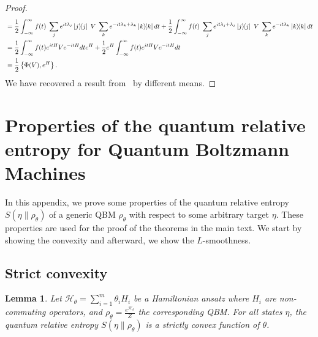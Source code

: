 \documentclass[
    aps,
    prx,
    onecolumn
]{revtex4-2}
\newtheorem{lemma}{Lemma}
\begin{document}
\begin{proof}
\begin{align}
\begin{split}
    &= \frac{1}{2} \int_{-\infty}^{\infty} f(t) \; \sum_{j} e^{it\lambda_j} \dyad{j} \; V \; \sum_{k} e^{-it\lambda_k + \lambda_k} \dyad{k} dt + \frac{1}{2}\int_{-\infty}^{\infty} f(t) \; \sum_{j} e^{it\lambda_j + \lambda_j} \dyad{j} \; V \; \sum_{k} e^{-it\lambda_k} \dyad{k} dt \\
    &= \frac{1}{2} \int_{-\infty}^{\infty} f(t) e^{itH} V e^{-itH} dt e^{H} + \frac{1}{2} e^H \int_{-\infty}^{\infty} f(t) e^{itH} V e^{-itH} dt  \\
    &= \frac{1}{2} \left\{ \Phi(V) , e^H\right\} .
\end{split}
\end{align}
We have recovered a result from~\cite{Hastings_2007} by different means. 
\end{proof}


\section{Properties of the quantum relative entropy for Quantum Boltzmann Machines}
\label{app:relentrop}

In this appendix, we prove some properties of the quantum relative entropy $S(\eta \|\rho_\theta)$ of a generic QBM $\rho_\theta$ with respect to some arbitrary target $\eta$. These properties are used for the proof of the theorems in the main text. We start by showing the convexity and afterward, we show the $L$-smoothness. 

\subsection{Strict convexity} 
\label{app:strict_conv}

\begin{lemma}
Let $\mathcal{H}_\theta = \sum_{i=1}^m \theta_{i} H_{i}$ be a Hamiltonian ansatz where $H_i$ are non-commuting operators, and $\rho_\theta = \frac{e^{\mathcal{H}_\theta}}{Z}$ the corresponding QBM. For all states $\eta$, the quantum relative entropy $S(\eta\|\rho_\theta)$ is a strictly convex function of $\theta$. 
\end{lemma}
\end{document}
